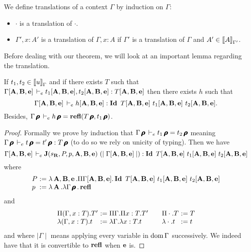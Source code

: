 \documentclass[a4paper,english]{lipics-utf8x}
\begin{document}
  \begin{definition}
    We define translations of a context $\Gamma$ by induction on $\Gamma$:
    \begin{itemize}
      \item $\cdot$ is a translation of $\cdot$.
      \item $\Gamma', x:A'$ is a translation of $\Gamma, x:A$ if $\Gamma'$ is
            a translation of $\Gamma$ and $A' \in \tr{A}{\Gamma'}$.
    \end{itemize}
  \end{definition}

  Before dealing with our theorem, we will look at an important lemma regarding
  the translation.

  \begin{lemma}
    \label{lem:transleq}
    If $t_1, t_2 \in \tr{u}{\Gamma}$ and if
    there exists $T$ such that
    $\Gamma\pfull \dere t_1\pfull, t_2\pfull : T\pfull$
    then there exists $h$ such that
    \[
      \Gamma\pfull \dere h\pfull : \Id T\pfull\ t_1\pfull\ t_2\pfull.
    \]
    Besides, $\Gamma\prfl \dere h\prfl = \refl(T\prfl,t_1\prfl)$.
  \end{lemma}

  \begin{proof}
    Formally we prove by induction that
    $\Gamma\prfl \dere t_1\prfl = t_2\prfl$
    meaning $\Gamma\prfl \dere t\prfl = t'\prfl : T\prfl$
    (to do so we rely on unicity of typing).
    Then we have
    \[
      \Gamma\pfull \dere \J(\sR, P, p, \mA, \mB, \me)\ %
      (\mid \Gamma\pfull \mid) : \Id T\pfull\ t_1\pfull\ t_2\pfull
    \]
    where
    \[
      \begin{array}{l@{~}l}
        P &:= \lambda \mA,\mB,\me. \Pi \Gamma\pfull. %
              \Id T\pfull\ t_1\pfull\ t_2\pfull \\
        p &:= \lambda \mA. \lambda \Gamma\prfl. \refl
      \end{array}
    \]
    and
    \[
      \begin{array}{l@{~}l@{\qquad}l@{~}l}
        \Pi (\Gamma, x:T).T' &:= \Pi \Gamma. \Pi x:T. T' &
        \Pi \cdot. T &:= T \\
        \lambda (\Gamma, x:T).t &:= \lambda \Gamma. \lambda x:T.t &
        \lambda \cdot.t &:= t
      \end{array}
    \]
    and where $\mid \Gamma \mid$ means applying every variable in $\dom \Gamma$
    successively.
    We indeed have that it is convertible to $\refl$ when $\me$ is.
  \end{proof}
\end{document}
